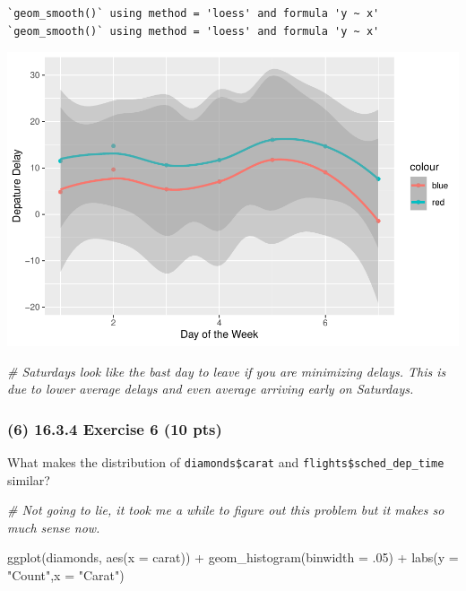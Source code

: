 \documentclass[
]{article}
\newenvironment{Shaded}{\begin{snugshade}}{\end{snugshade}}
\newcommand{\AttributeTok}[1]{\textcolor[rgb]{0.77,0.63,0.00}{#1}}
\newcommand{\CommentTok}[1]{\textcolor[rgb]{0.56,0.35,0.01}{\textit{#1}}}
\newcommand{\DecValTok}[1]{\textcolor[rgb]{0.00,0.00,0.81}{#1}}
\newcommand{\FunctionTok}[1]{\textcolor[rgb]{0.00,0.00,0.00}{#1}}
\newcommand{\NormalTok}[1]{#1}
\newcommand{\SpecialCharTok}[1]{\textcolor[rgb]{0.00,0.00,0.00}{#1}}
\newcommand{\StringTok}[1]{\textcolor[rgb]{0.31,0.60,0.02}{#1}}
\begin{document}
\begin{verbatim}
`geom_smooth()` using method = 'loess' and formula 'y ~ x'
`geom_smooth()` using method = 'loess' and formula 'y ~ x'
\end{verbatim}

\includegraphics{MidtermPR_files/figure-latex/unnamed-chunk-7-1.pdf}

\begin{Shaded}
\begin{Highlighting}[]
\CommentTok{\# Saturdays look like the bast day to leave if you are minimizing delays. This is due to lower average delays and even average arriving early on Saturdays.}
\end{Highlighting}
\end{Shaded}

\hypertarget{exercise-6-10-pts}{%
\subsubsection{(6) 16.3.4 Exercise 6 (10 pts)}\label{exercise-6-10-pts}}

What makes the distribution of \texttt{diamonds\$carat} and
\texttt{flights\$sched\_dep\_time} similar?

\begin{Shaded}
\begin{Highlighting}[]
\CommentTok{\# Not going to lie, it took me a while to figure out this problem but it makes so much sense now.}

\FunctionTok{ggplot}\NormalTok{(diamonds, }\FunctionTok{aes}\NormalTok{(}\AttributeTok{x =}\NormalTok{ carat)) }\SpecialCharTok{+}
  \FunctionTok{geom\_histogram}\NormalTok{(}\AttributeTok{binwidth =}\NormalTok{ .}\DecValTok{05}\NormalTok{) }\SpecialCharTok{+} 
  \FunctionTok{labs}\NormalTok{(}\AttributeTok{y =} \StringTok{"Count"}\NormalTok{,}\AttributeTok{x =} \StringTok{"Carat"}\NormalTok{)}
\end{Highlighting}
\end{Shaded}
\end{document}
